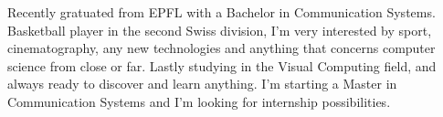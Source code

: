 

\begin{cvparagraph}

Recently gratuated from EPFL with a Bachelor in Communication Systems. Basketball player in the second Swiss division, I'm very interested by sport, cinematography, any new technologies and anything that concerns computer science from close or far. Lastly studying in the Visual Computing field, and always ready to discover and learn anything. I'm starting a Master in Communication Systems and I'm looking for internship possibilities.
\end{cvparagraph}
